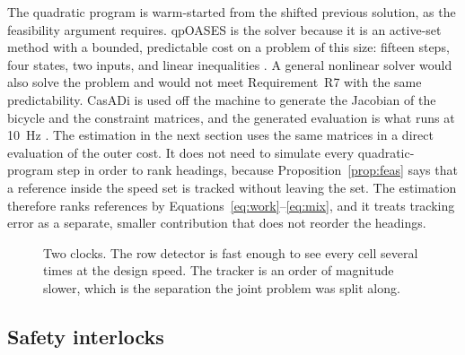 The quadratic program is warm-started from the shifted previous solution, as the feasibility argument requires. qpOASES is the solver because it is an active-set method with a bounded, predictable cost on a problem of this size: fifteen steps, four states, two inputs, and linear inequalities \cite{ferreau2014}. A general nonlinear solver would also solve the problem and would not meet Requirement~R7 with the same predictability. CasADi is used off the machine to generate the Jacobian of the bicycle and the constraint matrices, and the generated evaluation is what runs at \SI{10}{Hz} \cite{andersson2019}. The estimation in the next section uses the same matrices in a direct evaluation of the outer cost. It does not need to simulate every quadratic-program step in order to rank headings, because Proposition~\ref{prop:feas} says that a reference inside the speed set is tracked without leaving the set. The estimation therefore ranks references by Equations~\eqref{eq:work}--\eqref{eq:mix}, and it treats tracking error as a separate, smaller contribution that does not reorder the headings.

\begin{figure}[ht]
\centering
{}
\caption{Two clocks. The row detector is fast enough to see every cell several times at the design speed. The tracker is an order of magnitude slower, which is the separation the joint problem was split along.}
\label{fig:clocks}
\end{figure}

\subsection{Safety interlocks}


